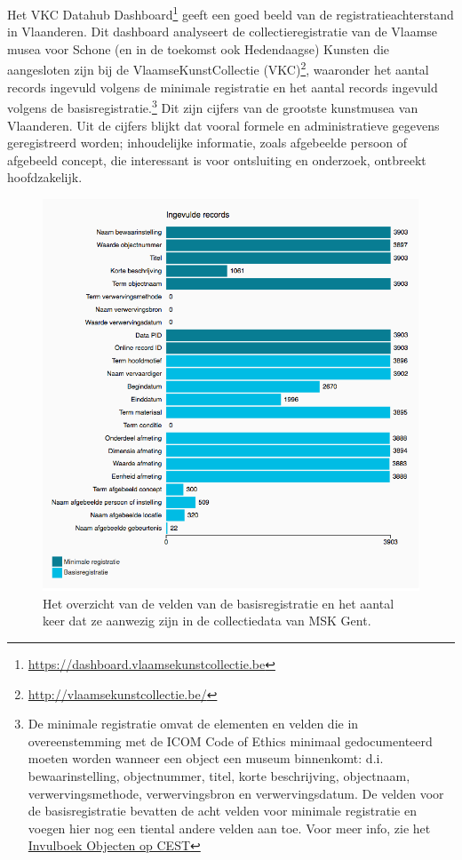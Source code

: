 Het VKC Datahub Dashboard\footnote{\url{https://dashboard.vlaamsekunstcollectie.be}} geeft een goed beeld van de registratieachterstand in Vlaanderen. Dit dashboard analyseert de collectieregistratie van de Vlaamse musea voor Schone (en in de toekomst ook Hedendaagse) Kunsten die aangesloten zijn bij de VlaamseKunstCollectie (VKC)\footnote{\url{http://vlaamsekunstcollectie.be/}}, waaronder het aantal records ingevuld volgens de minimale registratie en het aantal records ingevuld volgens de basisregistratie.\footnote{De minimale registratie omvat de elementen en velden die in overeenstemming met de ICOM Code of Ethics minimaal gedocumenteerd moeten worden wanneer een object een museum binnenkomt: d.i. bewaarinstelling, objectnummer, titel, korte beschrijving, objectnaam, verwervingsmethode, verwervingsbron en verwervingsdatum. De velden voor de basisregistratie bevatten de acht velden voor minimale registratie en voegen hier nog een tiental andere velden aan toe. Voor meer info, zie het \href{https://www.projectcest.be/wiki/Publicatie:Invulboek_objecten/Profielen/Basisregistratie}{Invulboek Objecten op CEST}} Dit zijn cijfers van de grootste kunstmusea van Vlaanderen. Uit de cijfers blijkt dat vooral formele en administratieve gegevens geregistreerd worden; inhoudelijke informatie, zoals afgebeelde persoon of afgebeeld concept, die interessant is voor ontsluiting en onderzoek, ontbreekt hoofdzakelijk.

\begin{figure}[h]
	\caption[Het overzicht van de velden van de basisregistratie]{Het overzicht van de velden van de basisregistratie en het aantal keer dat ze aanwezig zijn in de collectiedata van MSK Gent.}
	\centering
	\includegraphics[width=\linewidth]{../voorstel/pictures/VKC_velden_basis.png}
\end{figure}

